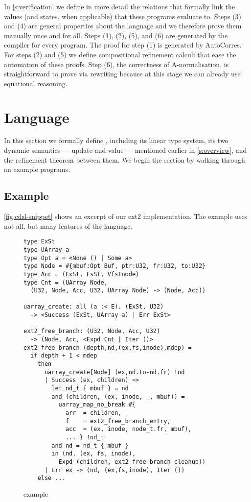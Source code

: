 \documentclass[9pt\ifFinal\else,preprint,nocopyrightspace\fi,\ifAlpha\else natbib,authoryear\fi]{sigplanconf}
\begin{document}
In \autoref{s:verification} we define in more detail the relations that
formally link the values (and states, when applicable) that these programs
evaluate to. Steps (3) and (4) are general properties about the language and
we therefore prove them manually once and for all. Steps (1), (2), (5), and
(6) are generated by the compiler for every program. The proof for step (1)
is generated by AutoCorres. For steps (2) and (5) we define compositional
refinement calculi that ease the automation of these proofs. Step (6), the
correctness of A-normalisation, is straightforward to prove via rewriting
because at this stage we can already use equational reasoning.










\section{Language}\label{s:lang}

In this section we formally define \CDSL, including its linear type system,
its two dynamic semantics --- update and value --- mentioned earlier in
\autoref{s:overview}, and the refinement theorem between them. We begin the section by walking through an example
\CDSL programs.

\subsection{Example}

\autoref{fig:cdsl-snippet} shows an excerpt of our \CDSL ext2 implementation.
The example uses not all, but many features of the language.







\begin{figure}[th]
\begin{lstlisting}[language=CDSL]
type ExSt
type UArray a
type Opt a = <None () | Some a>
type Node = #{mbuf:Opt Buf, ptr:U32, fr:U32, to:U32}
type Acc = (ExSt, FsSt, VfsInode)
type Cnt = (UArray Node, 
  (U32, Node, Acc, U32, UArray Node) -> (Node, Acc))

uarray_create: all (a :< E). (ExSt, U32) 
  -> <Success (ExSt, UArray a) | Err ExSt>

ext2_free_branch: (U32, Node, Acc, U32) 
  -> (Node, Acc, <Expd Cnt | Iter ()>
ext2_free_branch (depth,nd,(ex,fs,inode),mdep) =
  if depth + 1 < mdep 
    then
      uarray_create[Node] (ex,nd.to-nd.fr) !nd
      | Success (ex, children) =>
        let nd_t { mbuf } = nd
        and (children, (ex, inode, _, mbuf)) = 
          uarray_map_no_break #{
            arr  = children,
            f    = ext2_free_branch_entry,
            acc  = (ex, inode, node_t.fr, mbuf),
            ... } !nd_t
        and nd = nd_t { mbuf }
        in (nd, (ex, fs, inode), 
          Expd (children, ext2_free_branch_cleanup))
      | Err ex -> (nd, (ex,fs,inode), Iter ())
    else ...
\end{lstlisting}
\caption{\CDSL example}\label{fig:cdsl-snippet}
\end{figure}
\end{document}
